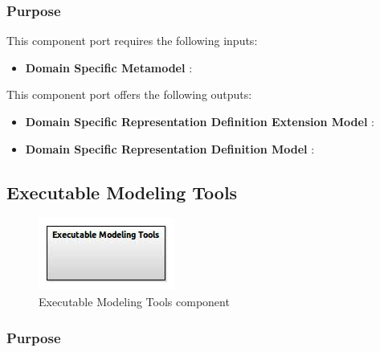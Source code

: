 \documentclass{gemoc} %
\begin{document}
\subsubsection{Purpose}

This component port requires the following inputs:
\begin{itemize}
  \item \textbf{Domain Specific Metamodel} :
\end{itemize}

This component port offers the following outputs:
\begin{itemize}
  \item \textbf{Domain Specific Representation Definition Extension Model} :
  \item \textbf{Domain Specific  Representation Definition Model} :
\end{itemize}

\subsection{Executable Modeling Tools}

\begin{figure}[htp]
	\begin{center}
	\includegraphics*[trim=0.0cm 0.0cm 0cm 0.0cm, clip=true, scale=1.0]{../images/generated/Generated_Executable Modeling Tools.jpg}
	\caption{Executable Modeling Tools component}
	\end{center}
\end{figure}

\subsubsection{Purpose}
\end{document}
